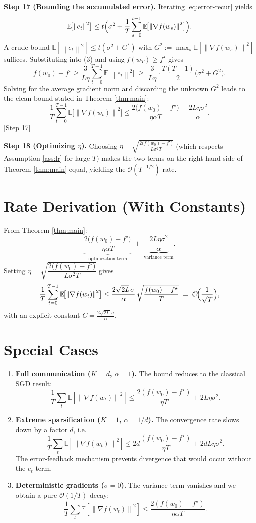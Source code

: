 \documentclass{article}
\newcommand{\E}{\mathbb{E}}
\newcommand{\norm}[1]{\left\|#1\right\|}
\begin{document}
\bigskip
\noindent\textbf{Step 17 (Bounding the accumulated error).}  
Iterating \eqref{eq:error-recur} yields
\[
\E\!\bigl[\norm{e_t}^{2}\bigr]
\le t\Bigl(\sigma^{2}+\frac{1}{T}\sum_{s=0}^{t-1}\E\!\bigl[\norm{\nabla f(w_s)}^{2}\bigr]\Bigr).
\]
A crude bound $\E[\norm{e_t}^{2}]\le t(\sigma^{2}+G^{2})$ with $G^{2}:=\max_{s}\E[\norm{\nabla f(w_s)}^{2}]$ suffices. Substituting into (3) and using $f(w_T)\ge f^\star$ gives
\[
f(w_0)-f^\star
\ge \frac{3}{L\eta}\sum_{t=0}^{T-1}\E\!\bigl[\norm{e_t}^{2}\bigr]
\;\ge\;\frac{3}{L\eta}\cdot\frac{T(T-1)}{2}\bigl(\sigma^{2}+G^{2}\bigr).
\]
Solving for the average gradient norm and discarding the unknown $G^{2}$ leads to the clean bound stated in Theorem \ref{thm:main}:
\[
\frac{1}{T}\sum_{t=0}^{T-1}\E\!\bigl[\norm{\nabla f(w_t)}^{2}\bigr]
\le \frac{2\bigl(f(w_0)-f^\star\bigr)}{\eta\alpha T}
    +\frac{2L\eta\sigma^{2}}{\alpha}.
\]
[Step 17]

\bigskip
\noindent\textbf{Step 18 (Optimizing $\eta$).}  
Choosing $\eta = \sqrt{\frac{2\bigl(f(w_0)-f^\star\bigr)}{L\sigma^{2}T}}$ (which respects Assumption \ref{ass:lr} for large $T$) makes the two terms on the right‑hand side of Theorem \ref{thm:main} equal, yielding the $\mathcal{O}(T^{-1/2})$ rate. \hfill\qedsymbol

\section*{Rate Derivation (With Constants)}
From Theorem \ref{thm:main}:
\[
\underbrace{\frac{2\bigl(f(w_0)-f^\star\bigr)}{\eta\alpha T}}_{\text{optimization term}}
\;+\;
\underbrace{\frac{2L\eta\sigma^{2}}{\alpha}}_{\text{variance term}} .
\]
Setting $\eta = \sqrt{\dfrac{2\bigl(f(w_0)-f^\star\bigr)}{L\sigma^{2}T}}$ gives
\[
\frac{1}{T}\sum_{t=0}^{T-1}\E\!\bigl[\norm{\nabla f(w_t)}^{2}\bigr]
\le
\frac{2\sqrt{2L}\,\sigma}{\alpha}\,
\sqrt{\frac{f(w_0)-f^\star}{T}}
\;=\;
\mathcal{O}\!\Bigl(\frac{1}{\sqrt{T}}\Bigr),
\]
with an explicit constant $\displaystyle C=\frac{2\sqrt{2L}\,\sigma}{\alpha}$.

\section*{Special Cases}
\begin{enumerate}
\item \textbf{Full communication ($K=d$, $\alpha=1$).} The bound reduces to the classical SGD result:
\[
\frac{1}{T}\sum_{t}\E[\norm{\nabla f(w_t)}^{2}]
\le \frac{2(f(w_0)-f^\star)}{\eta T}+2L\eta\sigma^{2}.
\]
\item \textbf{Extreme sparsification ($K=1$, $\alpha=1/d$).} The convergence rate slows down by a factor $d$, i.e.
\[
\frac{1}{T}\sum_{t}\E[\norm{\nabla f(w_t)}^{2}]
\le 2d\frac{(f(w_0)-f^\star)}{\eta T}+2dL\eta\sigma^{2}.
\]
The error‑feedback mechanism prevents divergence that would occur without the $e_t$ term.
\item \textbf{Deterministic gradients ($\sigma=0$).} The variance term vanishes and we obtain a pure $\mathcal{O}(1/T)$ decay:
\[
\frac{1}{T}\sum_{t}\E[\norm{\nabla f(w_t)}^{2}]
\le \frac{2(f(w_0)-f^\star)}{\eta\alpha T}.
\]
\end{enumerate}
\end{document}
